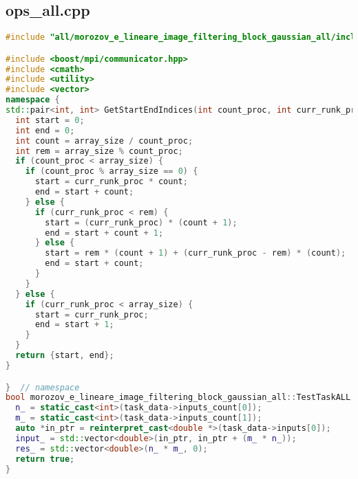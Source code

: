 \documentclass[a4paper,12pt]{article}
\begin{document}
\subsection{ops\_all.cpp}
\begin{lstlisting}[language=C++]
#include "all/morozov_e_lineare_image_filtering_block_gaussian_all/include/ops_all.hpp"

#include <boost/mpi/communicator.hpp>
#include <cmath>
#include <utility>
#include <vector>
namespace {
std::pair<int, int> GetStartEndIndices(int count_proc, int curr_runk_proc, int array_size) {
  int start = 0;
  int end = 0;
  int count = array_size / count_proc;
  int rem = array_size % count_proc;
  if (count_proc < array_size) {
    if (count_proc % array_size == 0) {
      start = curr_runk_proc * count;
      end = start + count;
    } else {
      if (curr_runk_proc < rem) {
        start = (curr_runk_proc) * (count + 1);
        end = start + count + 1;
      } else {
        start = rem * (count + 1) + (curr_runk_proc - rem) * (count);
        end = start + count;
      }
    }
  } else {
    if (curr_runk_proc < array_size) {
      start = curr_runk_proc;
      end = start + 1;
    }
  }
  return {start, end};
}

}  // namespace
bool morozov_e_lineare_image_filtering_block_gaussian_all::TestTaskALL::PreProcessingImpl() {
  n_ = static_cast<int>(task_data->inputs_count[0]);
  m_ = static_cast<int>(task_data->inputs_count[1]);
  auto *in_ptr = reinterpret_cast<double *>(task_data->inputs[0]);
  input_ = std::vector<double>(in_ptr, in_ptr + (m_ * n_));
  res_ = std::vector<double>(n_ * m_, 0);
  return true;
}


\end{lstlisting}
\end{document}
